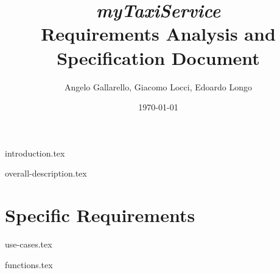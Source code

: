 \documentclass[12pt, a4paper]{article}
\begin{document}
\title{ \emph{ myTaxiService}\\ Requirements Analysis and Specification Document }

\author{Angelo Gallarello, Giacomo Locci, Edoardo Longo}
\date{\today}
\maketitle

\newpage

\tableofcontents

\newpage

{introduction.tex}

{overall-description.tex}

\section{Specific Requirements} %
\label{sec:specific_rquirements}

{use-cases.tex}

{functions.tex}
\end{document}
